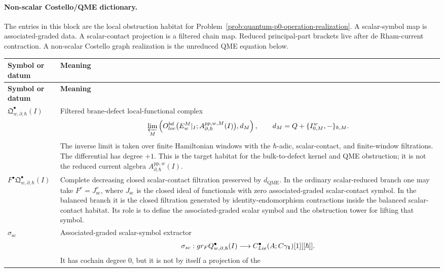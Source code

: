 \paragraph{Non-scalar Costello/QME dictionary.}
The entries in this block are the local obstruction habitat for
Problem~\ref{prob:quantum-p0-operation-realization}.  A scalar-symbol
map is associated-graded data.  A scalar-contact projection is a
filtered chain map.  Reduced principal-part brackets live after
de Rham-current contraction.  A non-scalar Costello graph realization is
the unreduced QME equation below.
\begin{longtable}{@{}>{\raggedright\arraybackslash}p{}
  >{\raggedright\arraybackslash}p{}@{}}
\hline
\textbf{Symbol or datum} & \textbf{Meaning}\\
\hline
\endfirsthead
\hline
\textbf{Symbol or datum} & \textbf{Meaning}\\
\hline
\endhead
\(\mathfrak Q^\bullet_{w,\partial,\hbar}(I)\) &
Filtered brane-defect local-functional complex
\[
  \varprojlim_M
  \left(
    \mathcal O_{\mathrm{loc}}^{\mathrm{bd}}\bigl(
      \mathcal E_w^M|_I;
      A_{\partial,\hbar}^{\mathrm{pp},w,M}(I)\bigr),
    d_M
  \right),
  \qquad d_M=Q+\{I^w_{0,M},-\}_{\hbar,M}.
\]
The inverse limit is taken over finite Hamiltonian windows with the
\(\hbar\)-adic, scalar-contact, and finite-window filtrations.  The
differential has degree \(+1\).  This is the target habitat for the
bulk-to-defect kernel and QME obstruction; it is not the reduced current
algebra \(A_{\partial,\hbar}^{\mathrm{pp},w}(I)\).\\
\hline
\(F^\bullet\mathfrak Q^\bullet_{w,\partial,\hbar}(I)\) &
Complete decreasing closed scalar-contact filtration preserved by
\(d_{\mathrm{QME}}\).  In the ordinary scalar-reduced branch one may take
\(F^r=J_{\mathrm{sc}}^r\), where \(J_{\mathrm{sc}}\) is the closed ideal
of functionals with zero associated-graded scalar-contact symbol.  In the
balanced branch it is the closed filtration generated by
identity-endomorphism contractions inside the balanced scalar-contact
habitat.  Its role is to define the associated-graded scalar symbol and
the obstruction tower for lifting that symbol.\\
\hline
\(\sigma_{\mathrm{sc}}\) &
Associated-graded scalar-symbol extractor
\[
  \sigma_{\mathrm{sc}}\colon
  \operatorname{gr}_F\mathfrak Q^\bullet_{w,\partial,\hbar}(I)
  \longrightarrow
  C^\bullet_{\mathrm{Lie}}(\bar A;\C\gamma_{\mathbf 1})[1][[\hbar]] .
\]
It has cochain degree \(0\), but it is not by itself a projection of the

\end{longtable}
